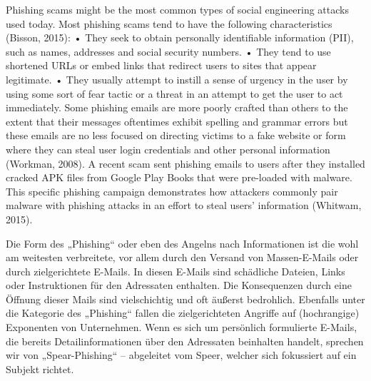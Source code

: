 Phishing scams might be the most common types of social engineering attacks used
today. Most phishing scams tend to have the following characteristics (Bisson, 2015):
• They seek to obtain personally identifiable information (PII), such as names, addresses
and social security numbers.
• They tend to use shortened URLs or embed links that redirect users to sites that appear
legitimate.
• They usually attempt to instill a sense of urgency in the user by using some sort of fear
tactic or a threat in an attempt to get the user to act immediately.
Some phishing emails are more poorly crafted than others to the extent that their
messages oftentimes exhibit spelling and grammar errors but these emails are no less focused
on directing victims to a fake website or form where they can steal user login credentials and
other personal information (Workman, 2008).
A recent scam sent phishing emails to users after they installed cracked APK files from
Google Play Books that were pre-loaded with malware. This specific phishing campaign
demonstrates how attackers commonly pair malware with phishing attacks in an effort to steal
users’ information (Whitwam, 2015).

Die Form des „Phishing“ oder eben des Angelns nach Informationen ist die wohl am weitesten
verbreitete, vor allem durch den Versand von Massen-E-Mails oder durch zielgerichtete
E-Mails. In diesen E-Mails sind schädliche Dateien, Links oder Instruktionen für
den Adressaten enthalten. Die Konsequenzen durch eine Öffnung dieser Mails sind vielschichtig
und oft äußerst bedrohlich.
Ebenfalls unter die Kategorie des „Phishing“ fallen die zielgerichteten Angriffe auf
(hochrangige) Exponenten von Unternehmen. Wenn es sich um persönlich formulierte
E-Mails, die bereits Detailinformationen über den Adressaten beinhalten handelt, sprechen
wir von „Spear-Phishing“ – abgeleitet vom Speer, welcher sich fokussiert auf ein
Subjekt richtet.

